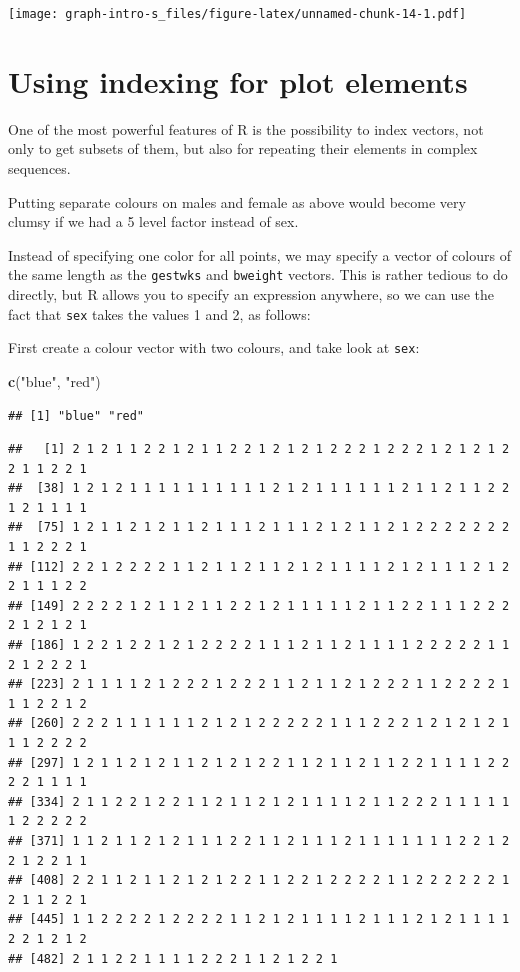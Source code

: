 \documentclass[
]{book}
\newenvironment{Shaded}{\begin{snugshade}}{\end{snugshade}}
\newcommand{\FunctionTok}[1]{\textcolor[rgb]{0.13,0.29,0.53}{\textbf{#1}}}
\newcommand{\NormalTok}[1]{#1}
\newcommand{\SpecialCharTok}[1]{\textcolor[rgb]{0.81,0.36,0.00}{\textbf{#1}}}
\newcommand{\StringTok}[1]{\textcolor[rgb]{0.31,0.60,0.02}{#1}}
\begin{document}
\texttt{[image: graph-intro-s\_files/figure-latex/unnamed-chunk-14-1.pdf]}

\section{Using indexing for plot elements}\label{using-indexing-for-plot-elements}

One of the most powerful features of R is the possibility to index
vectors, not only to get subsets of them, but also for repeating their
elements in complex sequences.

Putting separate colours on males and female as above would become
very clumsy if we had a 5 level factor instead of sex.

Instead of specifying one color for all points, we may specify a
vector of colours of the same length as the \texttt{gestwks} and
\texttt{bweight} vectors. This is rather tedious to do directly, but R
allows you to specify an expression anywhere, so we can use the fact
that \texttt{sex} takes the values 1 and 2, as follows:

First create a colour vector with two colours,
and take look at \texttt{sex}:

\begin{Shaded}
\begin{Highlighting}[]
\FunctionTok{c}\NormalTok{(}\StringTok{"blue"}\NormalTok{, }\StringTok{"red"}\NormalTok{)}
\end{Highlighting}
\end{Shaded}

\begin{verbatim}
## [1] "blue" "red"
\end{verbatim}

\begin{Shaded}
\end{Shaded}

\begin{verbatim}
##   [1] 2 1 2 1 1 2 2 1 2 1 1 2 2 1 2 1 2 1 2 2 2 1 2 2 2 1 2 1 2 1 2 2 1 1 2 2 1
##  [38] 1 2 1 2 1 1 1 1 1 1 1 1 1 1 2 1 2 1 1 1 1 1 1 2 1 1 2 1 1 2 2 1 2 1 1 1 1
##  [75] 1 2 1 1 2 1 2 1 1 2 1 1 1 2 1 1 1 2 1 2 1 1 2 1 2 2 2 2 2 2 2 1 1 2 2 2 1
## [112] 2 2 1 2 2 2 2 1 1 2 1 1 2 1 1 2 1 2 1 1 1 1 2 1 2 1 1 1 2 1 2 2 1 1 1 2 2
## [149] 2 2 2 2 1 2 1 1 2 1 1 2 2 1 2 1 1 1 1 1 2 1 1 2 2 1 1 1 2 2 2 2 1 2 1 2 1
## [186] 1 2 2 1 2 2 1 2 1 2 2 2 2 1 1 1 2 1 1 2 1 1 1 1 2 2 2 2 2 1 1 2 1 2 2 2 1
## [223] 2 1 1 1 1 2 1 2 2 2 1 2 2 2 1 1 2 1 1 2 1 2 2 2 1 1 2 2 2 2 1 1 1 2 2 1 2
## [260] 2 2 2 1 1 1 1 1 1 2 1 2 1 2 2 2 2 2 1 1 1 2 2 2 1 2 1 2 1 2 1 1 1 2 2 2 2
## [297] 1 2 1 1 2 1 2 1 1 2 1 2 1 2 2 1 1 2 1 1 2 1 1 2 2 1 1 1 1 2 2 2 2 1 1 1 1
## [334] 2 1 1 2 2 1 2 2 1 1 2 1 1 2 1 2 1 1 1 1 2 1 1 2 2 2 1 1 1 1 1 1 2 2 2 2 2
## [371] 1 1 2 1 1 2 1 2 1 1 1 2 2 1 1 2 1 1 1 2 1 1 1 1 1 1 1 2 2 1 2 2 1 2 2 1 1
## [408] 2 2 1 1 2 1 1 2 1 2 1 2 2 1 1 2 2 1 2 2 2 2 1 1 2 2 2 2 2 2 1 2 1 1 2 2 1
## [445] 1 1 2 2 2 2 1 2 2 2 2 1 1 2 1 2 1 1 1 1 2 1 1 1 2 1 2 1 1 1 1 2 2 1 2 1 2
## [482] 2 1 1 2 2 1 1 1 1 2 2 2 1 1 2 1 2 2 1
\end{verbatim}
\end{document}
